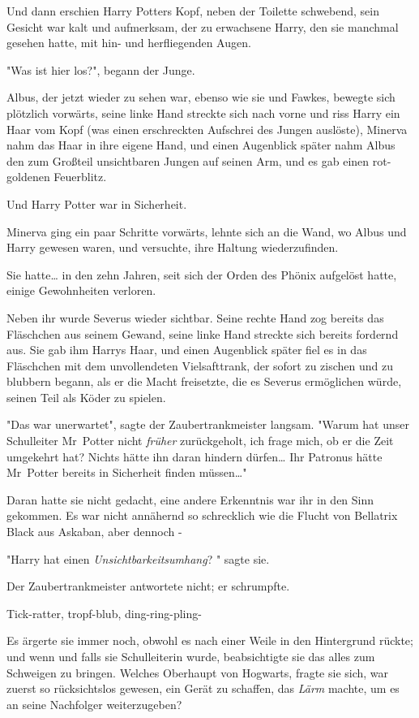 {Und dann erschien Harry Potters Kopf, neben der Toilette schwebend, sein Gesicht war kalt und aufmerksam, der zu erwachsene Harry, den sie manchmal gesehen hatte, mit hin- und herfliegenden Augen.

"Was ist hier los?", begann der Junge.

Albus, der jetzt wieder zu sehen war, ebenso wie sie und Fawkes, bewegte sich plötzlich vorwärts, seine linke Hand streckte sich nach vorne und riss Harry ein Haar vom Kopf (was einen erschreckten Aufschrei des Jungen auslöste), Minerva nahm das Haar in ihre eigene Hand, und einen Augenblick später nahm Albus den zum Großteil unsichtbaren Jungen auf seinen Arm, und es gab einen rot-goldenen Feuerblitz.

Und Harry Potter war in Sicherheit.

Minerva ging ein paar Schritte vorwärts, lehnte sich an die Wand, wo Albus und Harry gewesen waren, und versuchte, ihre Haltung wiederzufinden.

Sie hatte… in den zehn Jahren, seit sich der Orden des Phönix aufgelöst hatte, einige Gewohnheiten verloren.

Neben ihr wurde Severus wieder sichtbar. Seine rechte Hand zog bereits das Fläschchen aus seinem Gewand, seine linke Hand streckte sich bereits fordernd aus. Sie gab ihm Harrys Haar, und einen Augenblick später fiel es in das Fläschchen mit dem unvollendeten Vielsafttrank, der sofort zu zischen und zu blubbern begann, als er die Macht freisetzte, die es Severus ermöglichen würde, seinen Teil als Köder zu spielen.

"Das war unerwartet", sagte der Zaubertrankmeister langsam. "Warum hat unser Schulleiter Mr~Potter nicht \emph{früher} zurückgeholt, ich frage mich, ob er die Zeit umgekehrt hat? Nichts hätte ihn daran hindern dürfen… Ihr Patronus hätte Mr~Potter bereits in Sicherheit finden müssen…"

Daran hatte sie nicht gedacht, eine andere Erkenntnis war ihr in den Sinn gekommen. Es war nicht annähernd so schrecklich wie die Flucht von Bellatrix Black aus Askaban, aber dennoch -

"Harry hat einen \emph{Unsichtbarkeitsumhang}? " sagte sie.

Der Zaubertrankmeister antwortete nicht; er schrumpfte.

Tick-ratter, tropf-blub, ding-ring-pling-

Es ärgerte sie immer noch, obwohl es nach einer Weile in den Hintergrund rückte; und wenn und falls sie Schulleiterin wurde, beabsichtigte sie das alles zum Schweigen zu bringen. Welches Oberhaupt von Hogwarts, fragte sie sich, war zuerst so rücksichtslos gewesen, ein Gerät zu schaffen, das \emph{Lärm} machte, um es an seine Nachfolger weiterzugeben?

}
